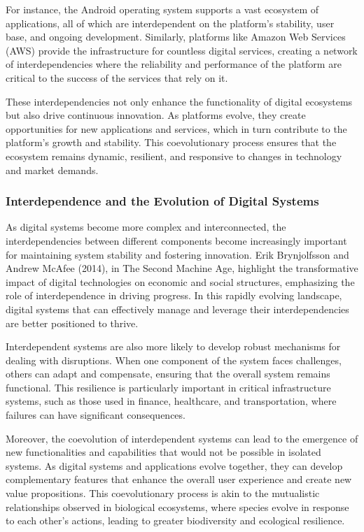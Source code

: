 \documentclass[12pt,twoside]{article}
\begin{document}
For instance, the Android operating system supports a vast ecosystem of applications, all of which are interdependent on the platform's stability, user base, and ongoing development. Similarly, platforms like Amazon Web Services (AWS) provide the infrastructure for countless digital services, creating a network of interdependencies where the reliability and performance of the platform are critical to the success of the services that rely on it.

These interdependencies not only enhance the functionality of digital ecosystems but also drive continuous innovation. As platforms evolve, they create opportunities for new applications and services, which in turn contribute to the platform's growth and stability. This coevolutionary process ensures that the ecosystem remains dynamic, resilient, and responsive to changes in technology and market demands.

\subsubsection{Interdependence and the Evolution of Digital Systems}

As digital systems become more complex and interconnected, the interdependencies between different components become increasingly important for maintaining system stability and fostering innovation. Erik Brynjolfsson and Andrew McAfee (2014), in The Second Machine Age, highlight the transformative impact of digital technologies on economic and social structures, emphasizing the role of interdependence in driving progress. In this rapidly evolving landscape, digital systems that can effectively manage and leverage their interdependencies are better positioned to thrive.

Interdependent systems are also more likely to develop robust mechanisms for dealing with disruptions. When one component of the system faces challenges, others can adapt and compensate, ensuring that the overall system remains functional. This resilience is particularly important in critical infrastructure systems, such as those used in finance, healthcare, and transportation, where failures can have significant consequences.

Moreover, the coevolution of interdependent systems can lead to the emergence of new functionalities and capabilities that would not be possible in isolated systems. As digital systems and applications evolve together, they can develop complementary features that enhance the overall user experience and create new value propositions. This coevolutionary process is akin to the mutualistic relationships observed in biological ecosystems, where species evolve in response to each other's actions, leading to greater biodiversity and ecological resilience.
\end{document}
